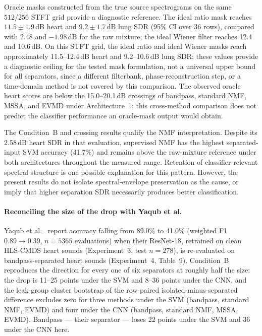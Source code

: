 \documentclass[journal]{IEEEtran}
\begin{document}
Oracle masks constructed from the true source spectrograms on the same $512/256$ STFT grid provide a diagnostic reference. The ideal ratio mask reaches $11.5\pm1.9$\,dB heart and $9.2\pm1.7$\,dB lung SDR (95\% CI over 36 rows), compared with 2.48 and $-1.98$\,dB for the raw mixture; the ideal Wiener filter reaches 12.4 and 10.6\,dB. On this STFT grid, the ideal ratio and ideal Wiener masks reach approximately 11.5--12.4\,dB heart and 9.2--10.6\,dB lung SDR; these values provide a diagnostic ceiling for the tested mask formulation, not a universal upper bound for all separators, since a different filterbank, phase-reconstruction step, or a time-domain method is not covered by this comparison. The observed oracle heart scores are below the 15.0--20.1\,dB crossings of bandpass, standard NMF, MSSA, and EVMD under Architecture~1; this cross-method comparison does not predict the classifier performance an oracle-mask output would obtain.

The Condition~B and crossing results qualify the NMF interpretation. Despite its 2.58\,dB heart SDR in that evaluation, supervised NMF has the highest separated-input SVM accuracy (41.7\%) and remains above the raw-mixture reference under both architectures throughout the measured range. Retention of classifier-relevant spectral structure is one possible explanation for this pattern. However, the present results do not isolate spectral-envelope preservation as the cause, or imply that higher separation SDR necessarily produces better classification.

\paragraph{Reconciling the size of the drop with Yaqub et al.}
Yaqub et al.\ \cite{yaqub2025} report accuracy falling from 89.0\% to 41.0\% (weighted F1 $0.89\to0.39$, $n=5365$ evaluations) when their ResNet-18, retrained on clean HLS-CMDS heart sounds (Experiment~3, test $n=278$), is re-evaluated on bandpass-separated heart sounds (Experiment~4, Table~9). Condition~B reproduces the direction for every one of six separators at roughly half the size: the drop is 11--25 points under the SVM and 8--36 points under the CNN, and the leak-group cluster bootstrap of the row-paired isolated-minus-separated difference excludes zero for three methods under the SVM (bandpass, standard NMF, EVMD) and four under the CNN (bandpass, standard NMF, MSSA, EVMD). Bandpass --- their separator --- loses 22 points under the SVM and 36 under the CNN here.
\end{document}
